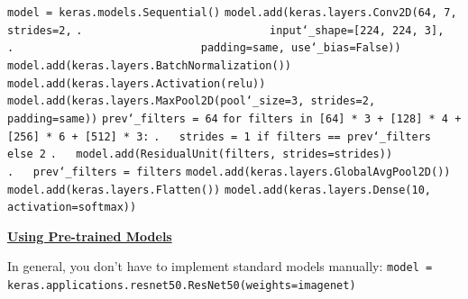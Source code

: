 \texttt{model = keras.models.Sequential()}\newline
\texttt{model.add(keras.layers.Conv2D(64, 7, strides=2,}\newline
\texttt{.~~~~~~~~~~~~~~~~~~~~~~~~~~~~~input\char`_shape=[224, 224, 3],}\newline
\texttt{.~~~~~~~~~~~~~~~~~~~~~~~~~~~~~padding=\textquotesingle same\textquotesingle, use\char`_bias=False))}\newline
\texttt{model.add(keras.layers.BatchNormalization())}\newline
\texttt{model.add(keras.layers.Activation(\textquotesingle relu\textquotesingle))}\newline
\texttt{model.add(keras.layers.MaxPool2D(pool\char`_size=3, strides=2, padding=\textquotesingle same\textquotesingle))}\newline
\texttt{prev\char`_filters = 64}\newline
\texttt{for filters in [64] * 3 + [128] * 4 + [256] * 6 + [512] * 3:}\newline
\texttt{.~~~strides = 1 if filters == prev\char`_filters else 2}\newline
\texttt{.~~~model.add(ResidualUnit(filters, strides=strides))}\newline
\texttt{.~~~prev\char`_filters = filters}\newline
\texttt{model.add(keras.layers.GlobalAvgPool2D())}\newline
\texttt{model.add(keras.layers.Flatten())}\newline
\texttt{model.add(keras.layers.Dense(10, activation=\textquotesingle softmax\textquotesingle))}

\newpage
\textbf{\underline{Using Pre-trained Models}}

In general, you don't have to implement standard models manually:\newline
\texttt{model = keras.applications.resnet50.ResNet50(weights=\textquotesingle imagenet\textquotesingle)}

